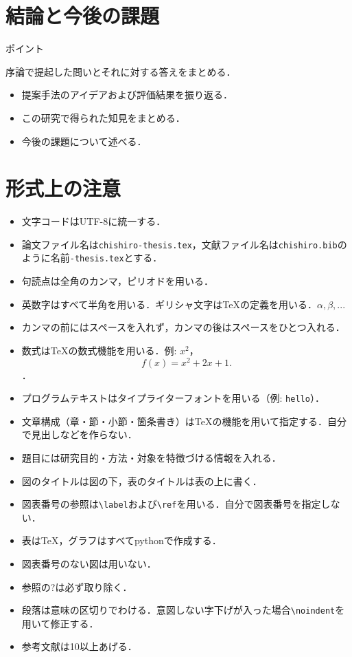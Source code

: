 \documentclass[a4j,11pt,report]{jsbook}
\newcommand{\point}[1]{
\begin{itembox}[l]{ポイント}
  #1
\end{itembox}
}
\begin{document}
\chapter{結論と今後の課題 \label{ch:conclusion}}

\point{
序論で提起した問いとそれに対する答えをまとめる．
\begin{itemize}
  \item 提案手法のアイデアおよび評価結果を振り返る．
  \item この研究で得られた知見をまとめる．
  \item 今後の課題について述べる．
\end{itemize}
}




\appendix

\chapter{形式上の注意}

\begin{itemize}
  \item 文字コードはUTF-8に統一する．
  \item 論文ファイル名は\texttt{chishiro-thesis.tex}，文献ファイル名は\texttt{chishiro.bib}のように名前\texttt{-thesis.tex}とする．
  \item 句読点は全角のカンマ，ピリオドを用いる．
  \item 英数字はすべて半角を用いる．ギリシャ文字は{\TeX}の定義を用いる．$\alpha, \beta, ...$
  \item カンマの前にはスペースを入れず，カンマの後はスペースをひとつ入れる．
  \item 数式は{\TeX}の数式機能を用いる．例: $x^2$，\[f(x) = x^2 + 2x + 1.\]．
  \item プログラムテキストはタイプライターフォントを用いる（例: \texttt{hello}）．
  \item 文章構成（章・節・小節・箇条書き）は{\TeX}の機能を用いて指定する．自分で見出しなどを作らない．
  \item 題目には研究目的・方法・対象を特徴づける情報を入れる．
  \item 図のタイトルは図の下，表のタイトルは表の上に書く．
  \item 図表番号の参照は\verb#\label#および\verb#\ref#を用いる．自分で図表番号を指定しない．
  \item 表は{\TeX}，グラフはすべてpythonで作成する．
  \item 図表番号のない図は用いない．
  \item 参照の?は必ず取り除く．
  \item 段落は意味の区切りでわける．意図しない字下げが入った場合\verb#\noindent#を用いて修正する．
  \item 参考文献は10以上あげる．
\end{itemize}
\end{document}
